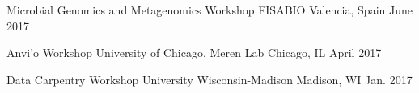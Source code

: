 \begin{cvhonors}
  \cvhonor
    {Microbial Genomics and Metagenomics Workshop} %
    {FISABIO} %
    {Valencia, Spain} %
    {June 2017} %

  \cvhonor
    {Anvi'o Workshop} %
    {University of Chicago, Meren Lab} %
    {Chicago, IL} %
    {April 2017} %

  \cvhonor
    {Data Carpentry Workshop} %
    {University Wisconsin-Madison} %
    {Madison, WI} %
    {Jan. 2017} %

\end{cvhonors}